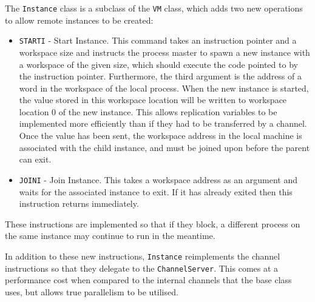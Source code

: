 The \texttt{Instance} class is a subclass of the \texttt{VM} class, which adds
two new operations to allow remote instances to be created:
\begin{itemize}
  \item
    \texttt{STARTI} - Start Instance. This command takes an instruction pointer
    and a workspace size and instructs the process master to spawn a new
    instance with a workspace of the given size, which should execute the code
    pointed to by the instruction pointer. Furthermore, the third argument is
    the address of a word in the workspace of the local process. When the new
    instance is started, the value stored in this workspace location will be
    written to workspace location 0 of the new instance. This allows replication
    variables to be implemented more efficiently than if they had to be
    transferred by a channel. Once the value has been sent, the workspace
    address in the local machine is associated with the child instance, and must
    be joined upon before the parent can exit.
  \item
    \texttt{JOINI} - Join Instance. This takes a workspace address as an
    argument and waits for the associated instance to exit. If it has already
    exited then this instruction returns immediately.
\end{itemize}
These instructions are implemented so that if they block, a different process on
the same instance may continue to run in the meantime.

In addition to these new instructions, \texttt{Instance} reimplements the
channel instructions so that they delegate to the \texttt{ChannelServer}. This
comes at a performance cost when compared to the internal channels that the base
class uses, but allows true parallelism to be utilised.
